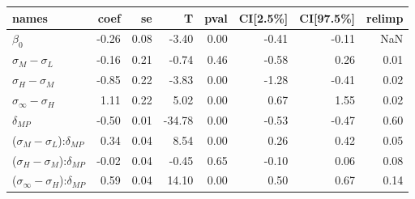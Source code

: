 \begin{tabular}{lrrrrrrr}
\toprule
                                         names &  coef &   se &      T &  pval &  CI[2.5\%] &  CI[97.5\%] &  relimp \\
\midrule
                                   $\beta_{0}$ & -0.26 & 0.08 &  -3.40 &  0.00 &      -0.41 &       -0.11 &     NaN \\
                     $\sigma_{M} - \sigma_{L}$ & -0.16 & 0.21 &  -0.74 &  0.46 &      -0.58 &        0.26 &    0.01 \\
                     $\sigma_{H} - \sigma_{M}$ & -0.85 & 0.22 &  -3.83 &  0.00 &      -1.28 &       -0.41 &    0.02 \\
                $\sigma_{\infty} - \sigma_{H}$ &  1.11 & 0.22 &   5.02 &  0.00 &       0.67 &        1.55 &    0.02 \\
                                 $\delta_{MP}$ & -0.50 & 0.01 & -34.78 &  0.00 &      -0.53 &       -0.47 &    0.60 \\
     ($\sigma_{M} - \sigma_{L}$):$\delta_{MP}$ &  0.34 & 0.04 &   8.54 &  0.00 &       0.26 &        0.42 &    0.05 \\
     ($\sigma_{H} - \sigma_{M}$):$\delta_{MP}$ & -0.02 & 0.04 &  -0.45 &  0.65 &      -0.10 &        0.06 &    0.08 \\
($\sigma_{\infty} - \sigma_{H}$):$\delta_{MP}$ &  0.59 & 0.04 &  14.10 &  0.00 &       0.50 &        0.67 &    0.14 \\
\bottomrule
\end{tabular}
